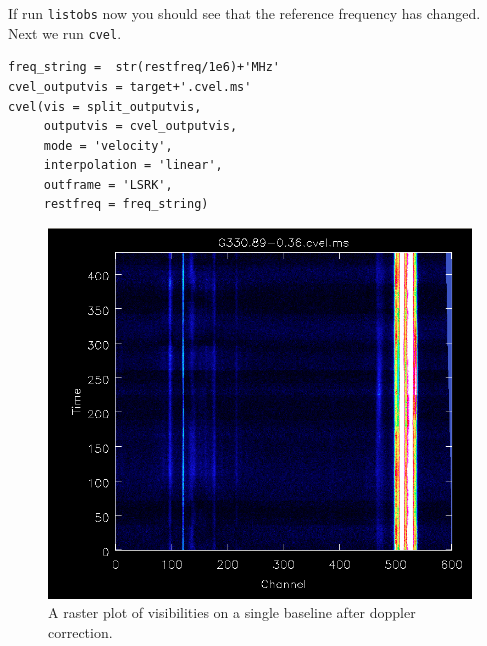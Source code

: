 \documentclass[force,almostfull,justified]{tufte-book}
\begin{document}
If run {\tt listobs} now you should see that the reference frequency has
changed.  Next we run {\tt cvel}.

\begin{casacmd}
\begin{verbatim}
freq_string =  str(restfreq/1e6)+'MHz'
cvel_outputvis = target+'.cvel.ms'
cvel(vis = split_outputvis,
     outputvis = cvel_outputvis,
     mode = 'velocity',
     interpolation = 'linear',
     outframe = 'LSRK',
     restfreq = freq_string)
\end{verbatim}
\end{casacmd}

\begin{figure}
  \includegraphics[width=\textwidth]{images/doppler_corrected}
  \caption[]{A raster plot of visibilities on a single baseline after doppler correction.}
  \forceversofloat
  \label{fig:doppler_corrected}
\end{figure}
\end{document}
